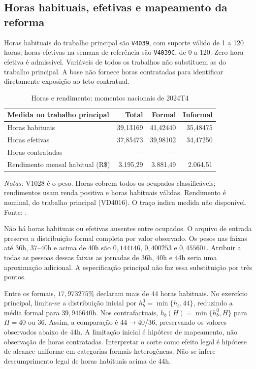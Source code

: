 \subsection{Horas habituais, efetivas e mapeamento da reforma}
Horas habituais do trabalho principal são \texttt{V4039}, com suporte válido de 1 a 120 horas; horas efetivas na semana de referência são \texttt{V4039C}, de 0 a 120. Zero hora efetiva é admissível. Variáveis de todos os trabalhos não substituem as do trabalho principal. A base não fornece horas contratadas para identificar diretamente exposição ao teto contratual.
\begin{table}[htbp]
\centering
\caption{Horas e rendimento: momentos nacionais de 2024T4}
\label{tab:app_hours}
\normalsize
\begin{tabular}{@{}lrrr@{}}
\toprule
Medida no trabalho principal & Total & Formal & Informal \\
\midrule
Horas habituais & 39,13169 & 41,42440 & 35,48475 \\
Horas efetivas & 37,85473 & 39,98102 & 34,47250 \\
Horas contratadas & --- & --- & --- \\
Rendimento mensal habitual (R\$) & 3.195,29 & 3.881,49 & 2.064,51 \\
\bottomrule
\end{tabular}
\begin{minipage}{0.94\textwidth}\normalsize
\textit{Notas:} V1028 é o peso. Horas cobrem todos os ocupados classificáveis; rendimentos usam renda positiva e horas habituais válidas. Rendimento é nominal, do trabalho principal (VD4016). O traço indica medida não disponível. Fonte: \citet{PNAD2024T4Microdados}.
\end{minipage}
\end{table}

Não há horas habituais ou efetivas ausentes entre ocupados. O arquivo de entrada preserva a distribuição formal completa por valor observado. Os pesos nas faixas até 36h, 37--40h e acima de 40h são $0{,}144146$, $0{,}400253$ e $0{,}455601$. Atribuir a todas as pessoas dessas faixas as jornadas de 36h, 40h e 44h seria uma aproximação adicional. A especificação principal não faz essa substituição por três pontos.

Entre os formais, $17{,}973275\%$ declaram mais de 44 horas habituais. No exercício principal, limita-se a distribuição inicial por $h_b^0=\min\{h_b,44\}$, reduzindo a média formal para $39{,}946640$h. Nos contrafactuais, $h_b(H)=\min\{h_b^0,H\}$ para $H=40$ ou $36$. Assim, a comparação é 44$\to$40/36, preservando os valores observados abaixo de 44h. A limitação inicial é hipótese de mapeamento, não observação de horas contratadas. Interpretar o corte como efeito legal é hipótese de alcance uniforme em categorias formais heterogêneas. Não se infere descumprimento legal de horas habituais acima de 44h.

